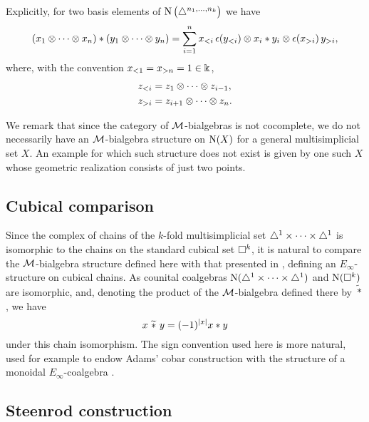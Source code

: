 Explicitly, for two basis elements of $\operatorname{N}\big(\triangle^{n_1,\dots,n_k}\big)$ we have
\[
(x_1 \otimes \dotsb \otimes x_n) \ast (y_1 \otimes \dotsb \otimes y_n) =
\sum_{i=1}^n x_{<i}\, \epsilon(y_{<i}) \otimes x_i \ast y_i \otimes \epsilon(x_{>i}) \, y_{>i},
\]
where, with the convention $x_{<1} = x_{>n} = 1 \in \Bbbk$,
\begin{align*}
	z_{<i} & = z_1 \otimes \dotsb \otimes z_{i-1}, \\
	z_{>i} & = z_{i+1} \otimes \dotsb \otimes z_n.
\end{align*}

We remark that since the category of $\mathcal{M}$-bialgebras is not cocomplete, we do not necessarily have an $\mathcal{M}$-bialgebra structure on $\operatorname{N}(X)$ for a general multisimplicial set $X$.
An example for which such structure does not exist is given by one such $X$ whose geometric realization consists of just two points.

\subsection{Cubical comparison}\label{ss:cubical}

Since the complex of chains of the $k$-fold multisimplicial set $\triangle^{1}\times\dots\times\triangle^{1}$ is isomorphic to the chains on the standard cubical set $\square^k$, it is natural to compare the $\mathcal{M}$-bialgebra structure defined here with that presented in \cite{medina2022cube_einfty}, defining an $E_\infty$-structure on cubical chains.
As counital coalgebras $\operatorname{N}(\triangle^{1}\times\dots\times\triangle^{1})$ and $\operatorname{N}(\square^k)$ are isomorphic, and, denoting the product of the $\mathcal{M}$-bialgebra defined there by $\widetilde\ast$, we have
\[
x \ \widetilde\ast \ y = (-1)^{\lvert x\rvert} x \ast y
\]
under this chain isomorphism.
The sign convention used here is more natural, used for example to endow Adams' cobar construction with the structure of a monoidal $E_\infty$-coalgebra \cite{medina2021cobar}.

\subsection{Steenrod construction}\label{ss:cup coproducts}

